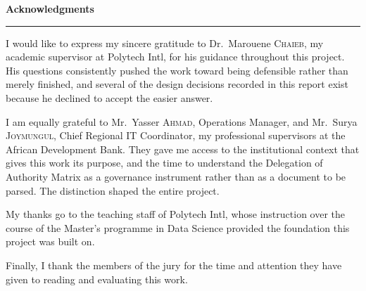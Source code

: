 
\thispagestyle{empty}

\vspace*{0.5cm}

{\noindent\Huge\sffamily\bfseries Acknowledgments\par}

\vspace{0.35cm}
\noindent\textcolor{myblue}{\rule{\textwidth}{1.4pt}}

\vspace{1.2cm}

\noindent I would like to express my sincere gratitude to Dr.~Marouene \textsc{Chaieb},
my academic supervisor at Polytech Intl, for his guidance throughout this project. His
questions consistently pushed the work toward being defensible rather than merely
finished, and several of the design decisions recorded in this report exist because he
declined to accept the easier answer.

\vspace{0.4cm}

\noindent I am equally grateful to Mr.~Yasser \textsc{Ahmad}, Operations Manager, and
Mr.~Surya \textsc{Joymungul}, Chief Regional IT Coordinator, my professional supervisors
at the African Development Bank. They gave me access to the institutional context that
gives this work its purpose, and the time to understand the Delegation of Authority
Matrix as a governance instrument rather than as a document to be parsed. The distinction
shaped the entire project.

\vspace{0.4cm}

\noindent My thanks go to the teaching staff of Polytech Intl, whose instruction over the
course of the Master's programme in Data Science provided the foundation this project was
built on.

\vspace{0.4cm}

\noindent Finally, I thank the members of the jury for the time and attention they have
given to reading and evaluating this work.

